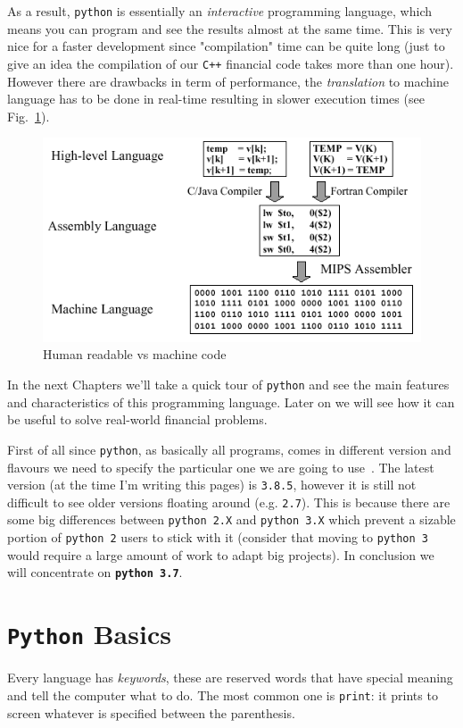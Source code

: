 As a result, \texttt{python} is essentially an \emph{interactive} programming language, which means you can program and see the results almost at the same time. This is very nice for a faster development since "compilation" time can be quite long (just to give an idea the compilation of our \texttt{C++} financial code takes more than one hour).
However there are drawbacks in term of performance, the \emph{translation} to machine language has to be done in real-time resulting in slower execution times (see Fig.~\ref{fig:compilation}).

\begin{figure}[h]
\centering
\includegraphics[width=0.5\linewidth]{figures/machine_language.png}
\caption{Human readable vs machine code}
\label{fig:compilation}
\end{figure}

In the next Chapters we'll take a quick tour of \texttt{python} and see the main features and characteristics of this programming language. Later on we will see how it can be useful to solve real-world financial problems.

First of all since \texttt{python}, as basically all programs, comes in different version and flavours we need to specify the particular one we are going to use~\cite{python_versions}.
The latest version (at the time I'm writing this pages) is \texttt{3.8.5}, however it is still not difficult to see older versions floating around (e.g. \texttt{2.7}).
This is because there are some big differences between \texttt{python 2.X} and \texttt{python 3.X} which prevent a sizable portion of \texttt{python 2} users to stick with it (consider that moving to \texttt{python 3} would require a large amount of work to adapt big projects).
In conclusion we will concentrate on \textbf{\texttt{python~3.7}}.

\section{\texttt{Python} Basics}
\label{python-basics}

Every language has \emph{keywords}, these are reserved words that have special meaning and tell the computer what to do. The most common one is \texttt{print}: it prints to screen whatever is specified between the parenthesis.

